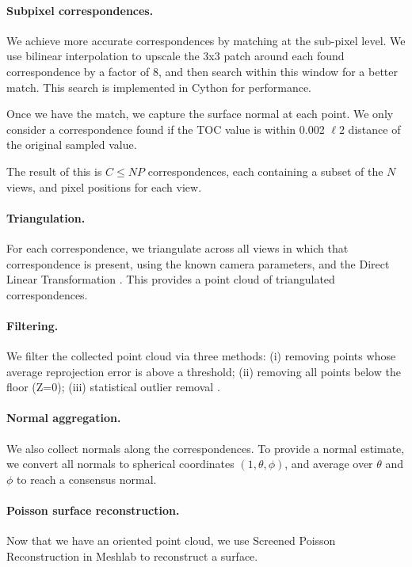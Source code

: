 \paragraph{Subpixel correspondences. } We achieve more accurate correspondences by matching at the sub-pixel level. We use bilinear interpolation to upscale the 3x3 patch around each found correspondence by a factor of 8, and then search within this window for a better match. This search is implemented in Cython \cite{behnel2010cython} for performance.

Once we have the match, we capture the surface normal at each point. We only consider a correspondence found if the TOC value is within 0.002 $\ell 2$ distance of the original sampled value.

The result of this is $C \leq NP$ correspondences, each containing a subset of the $N$ views, and pixel positions for each view.

\paragraph{Triangulation. } For each correspondence, we triangulate across all views in which that correspondence is present, using the known camera parameters, and the Direct Linear Transformation \cite{hartley2003multiple}. This provides a point cloud of triangulated correspondences.

\paragraph{Filtering. } We filter the collected point cloud via three methods: (i) removing points whose average reprojection error is above a threshold; (ii) removing all points below the floor (Z=0); (iii) statistical outlier removal \cite{kriegel2009loop}.

\paragraph{Normal aggregation. } We also collect normals along the correspondences. To provide a normal estimate, we convert all normals to spherical coordinates $(1, \theta, \phi)$, and average over $\theta$ and $\phi$ to reach a consensus normal.

\paragraph{Poisson surface reconstruction. } Now that we have an oriented point cloud, we use Screened Poisson Reconstruction \cite{kazhdan2013screened} in Meshlab \cite{meshlab} to reconstruct a surface.

